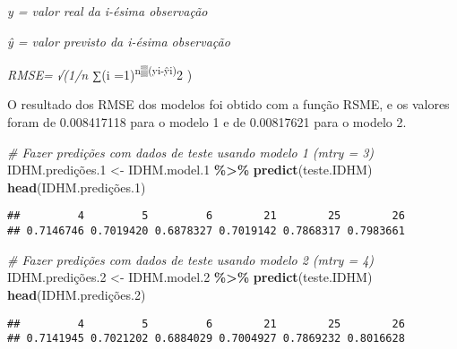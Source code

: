 \documentclass[
]{article}
\newenvironment{Shaded}{\begin{snugshade}}{\end{snugshade}}
\newcommand{\CommentTok}[1]{\textcolor[rgb]{0.56,0.35,0.01}{\textit{#1}}}
\newcommand{\FloatTok}[1]{\textcolor[rgb]{0.00,0.00,0.81}{#1}}
\newcommand{\FunctionTok}[1]{\textcolor[rgb]{0.13,0.29,0.53}{\textbf{#1}}}
\newcommand{\NormalTok}[1]{#1}
\newcommand{\OtherTok}[1]{\textcolor[rgb]{0.56,0.35,0.01}{#1}}
\newcommand{\SpecialCharTok}[1]{\textcolor[rgb]{0.81,0.36,0.00}{\textbf{#1}}}
\begin{document}
\emph{y = valor real da i-ésima observação}

\emph{ŷ = valor previsto da i-ésima observação}

\emph{RMSE= √(1/n ∑}(i =1)\textsuperscript{n▒(yi-ŷi)}2 )

O resultado dos RMSE dos modelos foi obtido com a função RSME, e os
valores foram de 0.008417118 para o modelo 1 e de 0.00817621 para o
modelo 2.

\begin{Shaded}
\begin{Highlighting}[]
\CommentTok{\# Fazer predições com dados de teste usando modelo 1 (mtry = 3)}
\NormalTok{IDHM.predições}\FloatTok{.1} \OtherTok{\textless{}{-}}\NormalTok{ IDHM.model}\FloatTok{.1} \SpecialCharTok{\%\textgreater{}\%} \FunctionTok{predict}\NormalTok{(teste.IDHM)}
\FunctionTok{head}\NormalTok{(IDHM.predições}\FloatTok{.1}\NormalTok{)}
\end{Highlighting}
\end{Shaded}

\begin{verbatim}
##         4         5         6        21        25        26 
## 0.7146746 0.7019420 0.6878327 0.7019142 0.7868317 0.7983661
\end{verbatim}

\begin{Shaded}
\begin{Highlighting}[]
\CommentTok{\# Fazer predições com dados de teste usando modelo 2 (mtry = 4)}
\NormalTok{IDHM.predições}\FloatTok{.2} \OtherTok{\textless{}{-}}\NormalTok{ IDHM.model}\FloatTok{.2} \SpecialCharTok{\%\textgreater{}\%} \FunctionTok{predict}\NormalTok{(teste.IDHM)}
\FunctionTok{head}\NormalTok{(IDHM.predições}\FloatTok{.2}\NormalTok{)}
\end{Highlighting}
\end{Shaded}

\begin{verbatim}
##         4         5         6        21        25        26 
## 0.7141945 0.7021202 0.6884029 0.7004927 0.7869232 0.8016628
\end{verbatim}

\begin{Shaded}
\end{Shaded}
\end{document}
